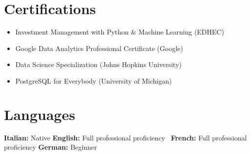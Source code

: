 \documentclass[letterpaper,10.5pt]{article}
\begin{document}
\section*{Certifications}
\begin{itemize}[leftmargin=0.2in]
\item Investment Management with Python & Machine Learning (EDHEC)
\item Google Data Analytics Professional Certificate (Google)
\item Data Science Specialization (Johns Hopkins University)
\item PostgreSQL for Everybody (University of Michigan)
\end{itemize}

\section*{Languages}
\textbf{Italian:} Native \quad \textbf{English:} Full professional proficiency \
\textbf{French:} Full professional proficiency \quad \textbf{German:} Beginner
\end{document}

